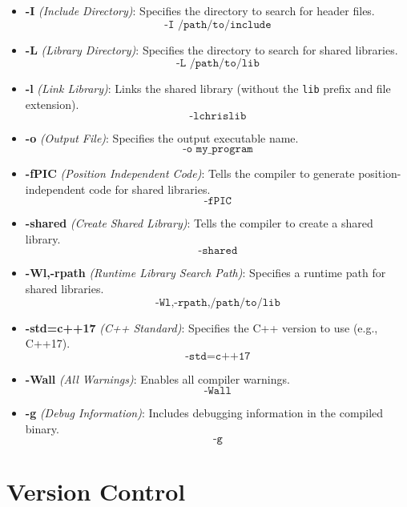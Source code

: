 \begin{itemize}
    \item \textbf{-I} \textit{(Include Directory)}: Specifies the directory to search for header files.
    \[
    \texttt{-I /path/to/include}
    \]
    
    \item \textbf{-L} \textit{(Library Directory)}: Specifies the directory to search for shared libraries.
    \[
    \texttt{-L /path/to/lib}
    \]

    \item \textbf{-l} \textit{(Link Library)}: Links the shared library (without the \texttt{lib} prefix and file extension).
    \[
    \texttt{-lchrislib}
    \]

    \item \textbf{-o} \textit{(Output File)}: Specifies the output executable name.
    \[
    \texttt{-o my\_program}
    \]

    \item \textbf{-fPIC} \textit{(Position Independent Code)}: Tells the compiler to generate position-independent code for shared libraries.
    \[
    \texttt{-fPIC}
    \]

    \item \textbf{-shared} \textit{(Create Shared Library)}: Tells the compiler to create a shared library.
    \[
    \texttt{-shared}
    \]

    \item \textbf{-Wl,-rpath} \textit{(Runtime Library Search Path)}: Specifies a runtime path for shared libraries.
    \[
    \texttt{-Wl,-rpath,/path/to/lib}
    \]

    \item \textbf{-std=c++17} \textit{(C++ Standard)}: Specifies the C++ version to use (e.g., C++17).
    \[
    \texttt{-std=c++17}
    \]

    \item \textbf{-Wall} \textit{(All Warnings)}: Enables all compiler warnings.
    \[
    \texttt{-Wall}
    \]

    \item \textbf{-g} \textit{(Debug Information)}: Includes debugging information in the compiled binary.
    \[
    \texttt{-g}
    \]
\end{itemize}

\section{Version Control}

